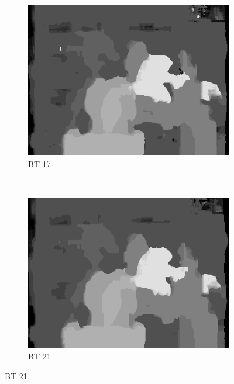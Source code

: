\begin{figure}
\begin{subfigure}[b]{0.23\textwidth}
    \includegraphics[width=\textwidth]{images/stereo-pairs/tsukuba_bt_17.png}
    \caption{BT 17}
  \end{subfigure}
  ~
  \begin{subfigure}[b]{0.23\textwidth}
    \centering
    \includegraphics[width=\textwidth]{images/stereo-pairs/tsukuba_bt_21.png}
    \caption{BT 21}
  \end{subfigure}



\end{figure}
